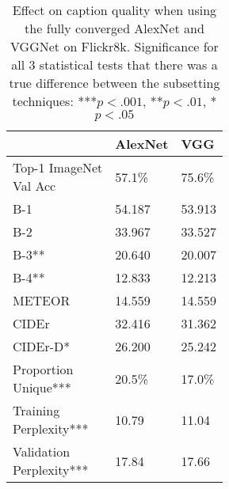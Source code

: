 \documentclass[11pt]{article}
\begin{document}
\begin{table}[t]
\centering
\begin{tabular}{|l|l|l|}
  \hline
     & AlexNet & VGG\\\hline
\pbox{20cm}{Top-1 ImageNet\\Val Acc} &
  57.1\% & 75.6\%\\\hline\hline B-1 & 54.187 & 53.913\\\hline B-2 & 33.967 &
  33.527\\\hline B-3** & 20.640 & 20.007\\\hline B-4** & 12.833 &
  12.213\\\hline METEOR & 14.559 & 14.559\\\hline CIDEr & 32.416 &
  31.362\\\hline CIDEr-D* & 26.200 & 25.242\\\hline\hline
  \pbox{20cm}{Proportion\\Unique***} & 20.5\% & 17.0\%\\\hline
  \pbox{20cm}{Training\\Perplexity***} & 10.79 & 11.04\\\hline
  \pbox{20cm}{Validation\\Perplexity***} & 17.84 & 17.66\\\hline
\end{tabular}
\caption{Effect on caption quality when using the fully converged
  AlexNet and VGGNet on Flickr8k. Significance for all 3 statistical
  tests that there was a true difference between the subsetting
  techniques: ***$p<.001$, **$p<.01$, *$p<.05$}
    \label{tab:alexvgg}
\end{table}
\end{document}
